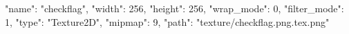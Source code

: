 {
  "name": "checkflag",
  "width": 256,
  "height": 256,
  "wrap_mode": 0,
  "filter_mode": 1,
  "type": "Texture2D",
  "mipmap": 9,
  "path": "texture/checkflag.png.tex.png"
}